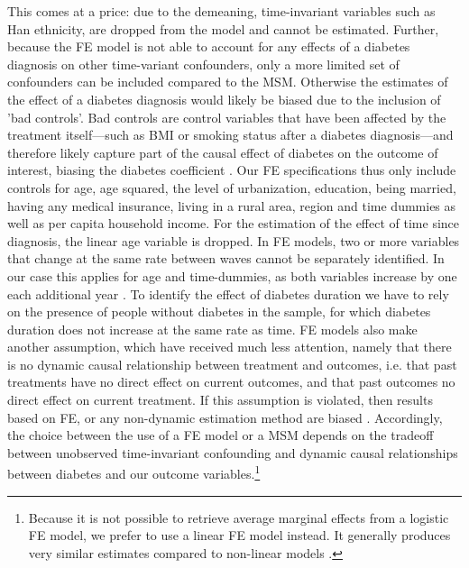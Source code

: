 This comes at a price: due to the demeaning, time-invariant variables such as Han ethnicity, are dropped from the model and cannot be estimated. Further, because the \ac{FE} model is not able to account for any effects of a diabetes diagnosis on other time-variant confounders, only a more limited set of confounders can be included compared to the \ac{MSM}. Otherwise the estimates of the effect of a diabetes diagnosis would likely be biased due to the inclusion of 'bad controls'. Bad controls are control variables that have been affected by the treatment itself---such as \ac{BMI} or smoking status after a diabetes diagnosis---and therefore likely capture part of the causal effect of diabetes on the outcome of interest, biasing the diabetes coefficient \parencite{Angrist2009a}. Our \ac{FE} specifications thus only include controls for age, age squared, the level of urbanization, education, being married, having any medical insurance, living in a rural area, region and time dummies as well as per capita household income. For the estimation of the effect of time since diagnosis, the linear age variable is dropped. In \ac{FE} models, two or more variables that change at the same rate between waves cannot be separately identified. In our case this applies for age and time-dummies, as both variables increase by one each additional year \parencite{Wooldridge2012}. To identify the effect of diabetes duration we have to rely on the presence of people without diabetes in the sample, for which diabetes duration does not increase at the same rate as time. \ac{FE} models also make another assumption, which have received much less attention, namely that there is no dynamic causal relationship between treatment and outcomes, i.e. that past treatments have no direct effect on current outcomes, and that past outcomes no direct effect on current treatment. If this assumption is violated, then results based on \ac{FE}, or any non-dynamic estimation method are biased \parencite{Imai2016}. Accordingly, the choice between the use of a \ac{FE} model or a \ac{MSM} depends on the tradeoff between unobserved time-invariant confounding and dynamic causal relationships between diabetes and our outcome variables.\footnote{Because it is not possible to retrieve average marginal effects from a logistic \ac{FE} model, we prefer to use a linear \ac{FE} model instead. It generally produces very similar estimates compared to non-linear models \parencite{Angrist2009a}.}

